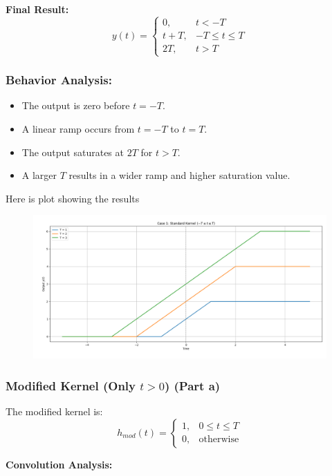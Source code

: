 \textbf{Final Result:}
\begin{equation}
y(t) = 
\begin{cases} 
0, & t < -T \\
t + T, & -T \leq t \leq T \\
2T, & t > T 
\end{cases}
\end{equation}

\subsubsection{Behavior Analysis:}
\begin{itemize}
    \item The output is zero before \( t = -T \).
    \item A linear ramp occurs from \( t = -T \) to \( t = T \).
    \item The output saturates at \( 2T \) for \( t > T \).
    \item A larger \( T \) results in a wider ramp and higher saturation value.
\end{itemize}
Here is plot showing the results
\begin{figure}[H]
    \centering
    \includegraphics[width=0.8\linewidth]{codes/codes_step/plotsstep/case1step.png}
    \label{fig:enter-label}
\end{figure}
\subsubsection{Modified Kernel (Only \( t > 0 \)) (Part a)}

The modified kernel is:
\begin{equation}
h_{mod}(t) = 
\begin{cases} 
1, & 0 \leq t \leq T \\
0, & \text{otherwise}
\end{cases}
\end{equation}

\textbf{Convolution Analysis:}

